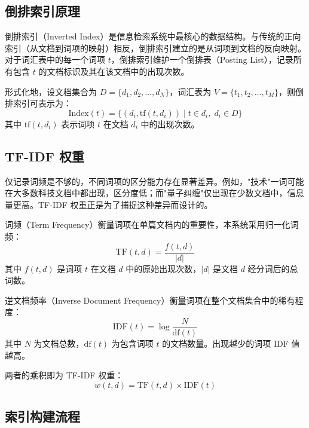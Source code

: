 \documentclass[12pt, a4paper]{ctexart}
\begin{document}
\subsection{倒排索引原理}

倒排索引（Inverted Index）是信息检索系统中最核心的数据结构。与传统的正向索引（从文档到词项的映射）相反，倒排索引建立的是从词项到文档的反向映射。对于词汇表中的每一个词项 $t$，倒排索引维护一个倒排表（Posting List），记录所有包含 $t$ 的文档标识及其在该文档中的出现次数。

形式化地，设文档集合为 $D = \{d_1, d_2, \ldots, d_N\}$，词汇表为 $V = \{t_1, t_2, \ldots, t_M\}$，则倒排索引可表示为：
\begin{equation}
    \text{Index}(t) = \{(d_i, \text{tf}(t, d_i)) \mid t \in d_i, \; d_i \in D\}
\end{equation}
其中 $\text{tf}(t, d_i)$ 表示词项 $t$ 在文档 $d_i$ 中的出现次数。

\subsection{TF-IDF 权重}

仅记录词频是不够的，不同词项的区分能力存在显著差异。例如，"技术"一词可能在大多数科技文档中都出现，区分度低；而"量子纠缠"仅出现在少数文档中，信息量更高。TF-IDF 权重正是为了捕捉这种差异而设计的。

词频（Term Frequency）衡量词项在单篇文档内的重要性，本系统采用归一化词频：
\begin{equation}
    \text{TF}(t, d) = \frac{f(t, d)}{|d|}
\end{equation}
其中 $f(t, d)$ 是词项 $t$ 在文档 $d$ 中的原始出现次数，$|d|$ 是文档 $d$ 经分词后的总词数。

逆文档频率（Inverse Document Frequency）衡量词项在整个文档集合中的稀有程度：
\begin{equation}
    \text{IDF}(t) = \log \frac{N}{\text{df}(t)}
\end{equation}
其中 $N$ 为文档总数，$\text{df}(t)$ 为包含词项 $t$ 的文档数量。出现越少的词项 IDF 值越高。

两者的乘积即为 TF-IDF 权重：
\begin{equation}
    w(t, d) = \text{TF}(t, d) \times \text{IDF}(t)
\end{equation}

\subsection{索引构建流程}
\end{document}
